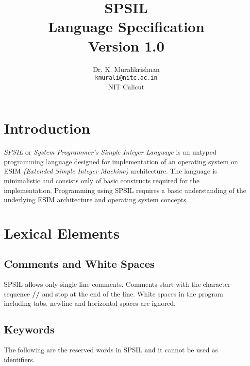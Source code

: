 \documentclass[11pt]{article}
\title{SPSIL \\ Language Specification \\
Version 1.0}
\author{Dr. K. Muralikrishnan  \\ \texttt{kmurali@nitc.ac.in} \\ {NIT Calicut} }
\begin{document}
 \newcommand{\kw}[1]{\texttt{#1}}

\maketitle

\pagebreak
\thispagestyle{plain}

\tableofcontents
\pagebreak


\section{Introduction}
\paragraph{}
\textit{SPSIL} or \textit{System Programmer's Simple Integer Language} is an untyped programming language designed for implementation of an operating system on ESIM \textit{(Extended Simple Integer Machine)} architecture. The language is minimalistic and consists only of basic constructs required for the implementation. Programming using SPSIL requires a  basic understanding of the underlying ESIM architecture and operating system concepts. 



\section{Lexical Elements}




\subsection{Comments and White Spaces}

SPSIL allows only single line comments. Comments start with the character sequence \textbf{//} and stop at the end of the line. 
White spaces in the program including tabs, newline and horizontal spaces are ignored.


\subsection{Keywords}
The following are the reserved words in SPSIL and it cannot be used as identifiers.
\end{document}
